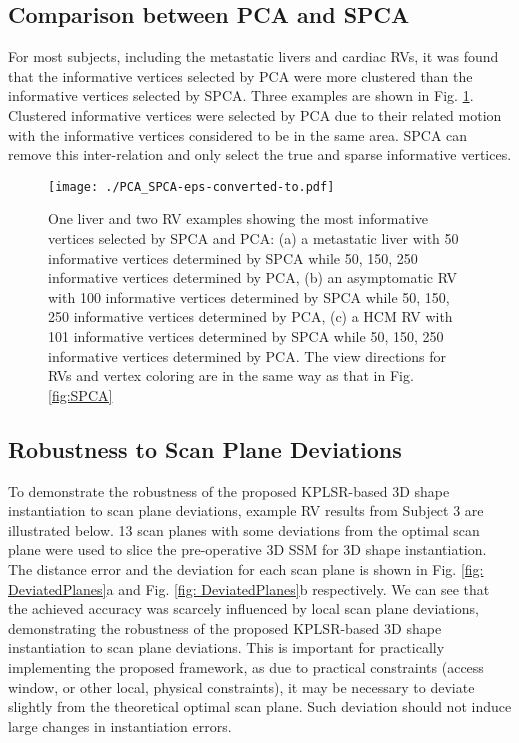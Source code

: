 \documentclass[review]{elsarticle}
\begin{document}
\subsection{Comparison between PCA and SPCA}
\label{sub: PCA and SPCA}
For most subjects, including the metastatic livers and cardiac RVs, it was found that the informative vertices selected by PCA were more clustered than the informative vertices selected by SPCA. Three examples are shown in Fig. \ref{fig:PCA_SPCA}. Clustered informative vertices were selected by PCA due to their related motion with the informative vertices considered to be in the same area. SPCA can remove this inter-relation and only select the true and sparse informative vertices.

\begin{figure}[thpb]
\centering
\texttt{[image: ./PCA\_SPCA-eps-converted-to.pdf]}
\caption{One liver and two RV examples showing the most informative vertices selected by SPCA and PCA: (a) a metastatic liver with 50 informative vertices determined by SPCA while 50, 150, 250 informative vertices determined by PCA, (b) an asymptomatic RV with 100 informative vertices determined by SPCA while 50, 150, 250 informative vertices determined by PCA, (c) a HCM RV with 101 informative vertices determined by SPCA while 50, 150, 250 informative vertices determined by PCA. The view directions for RVs and vertex coloring are in the same way as that in Fig. \ref{fig:SPCA}}
\label{fig:PCA_SPCA}
\end{figure}

\subsection{Robustness to Scan Plane Deviations}
\label{sub: Scan Plane Deviation}
To demonstrate the robustness of the proposed KPLSR-based 3D shape instantiation to scan plane deviations, example RV results from Subject 3 are illustrated below. 13 scan planes with some deviations from the optimal scan plane were used to slice the pre-operative 3D SSM for 3D shape instantiation. The distance error and the deviation for each scan plane is shown in Fig. \ref{fig: DeviatedPlanes}a and Fig. \ref{fig: DeviatedPlanes}b respectively. We can see that the achieved accuracy was scarcely influenced by local scan plane deviations, demonstrating the robustness of the proposed KPLSR-based 3D shape instantiation to scan plane deviations. This is important for practically implementing the proposed framework, as due to practical constraints (access window, or other local, physical constraints), it may be necessary to deviate slightly from the theoretical optimal scan plane. Such deviation should not induce large changes in instantiation errors.
\end{document}
